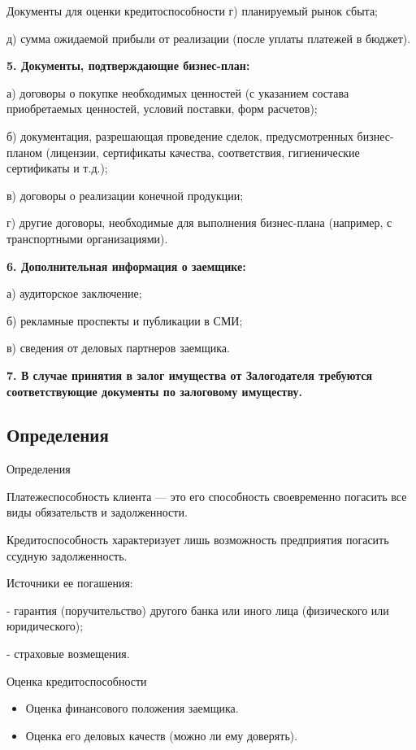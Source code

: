 \documentclass[_Banking_p2.tex]{subfiles}
\begin{document}
\begin{frame}[allowframebreaks]{Документы для оценки кредитоспособности}
г) планируемый рынок сбыта;

д) сумма ожидаемой прибыли от реализации (после уплаты платежей в бюджет).

\pagebreak
\textbf{5. Документы, подтверждающие бизнес-план:}

а) договоры о покупке необходимых ценностей (с указанием состава приобретаемых ценностей, условий поставки, форм расчетов);

б) документация, разрешающая проведение сделок, предусмотренных бизнес-планом (лицензии, сертификаты качества, соответствия, гигиенические сертификаты и т.д.);

в) договоры о реализации конечной продукции;

г) другие договоры, необходимые для выполнения бизнес-плана (например, с
транспортными организациями).

\pagebreak
\textbf{6. Дополнительная информация о заемщике:}

а) аудиторское заключение;

б) рекламные проспекты и публикации в СМИ;

в) сведения от деловых партнеров заемщика.

\textbf{7. В случае принятия в залог имущества от Залогодателя требуются соответствующие документы по залоговому имуществу.}
\end{frame}
\subsection{Определения}
\begin{frame}{Определения}
\begin{block}{Платежеспособность клиента}
	\quad — это его способность своевременно погасить все виды обязательств и задолженности.	
\end{block}

\begin{block}{Кредитоспособность}
\quad характеризует лишь возможность предприятия
погасить ссудную задолженность.

Источники ее погашения:

- гарантия (поручительство) другого банка или
иного лица (физического или юридического);

- страховые возмещения.
\end{block}
\end{frame}

\begin{frame}{Оценка кредитоспособности}
\begin{itemize}
	\item Оценка финансового положения заемщика.
	\item Оценка его деловых качеств (можно ли ему доверять).	
\end{itemize}
\end{frame}
\end{document}
